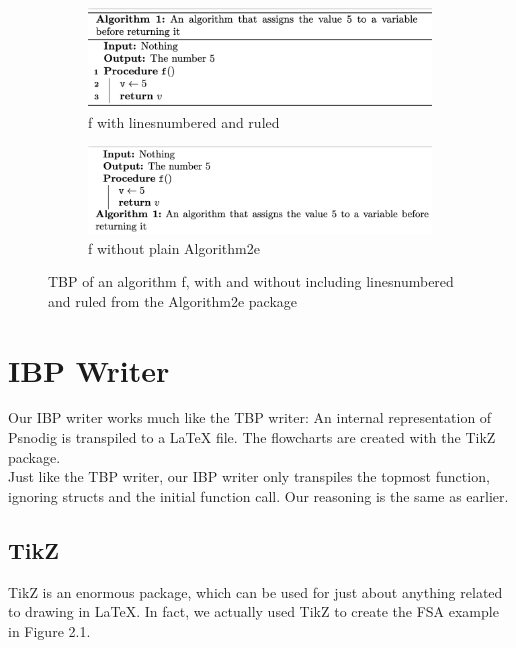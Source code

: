 {\begin{figure}[ht]
\centering
\begin{subfigure}{.5\textwidth}
  \centering
  \includegraphics[width=.9\linewidth]{assets/return5pretty.png}
  \caption{f with linesnumbered and ruled}
  \label{fig:algoUgly}
\end{subfigure}%
\begin{subfigure}{.5\textwidth}
  \centering
  \includegraphics[width=.9\linewidth]{assets/return5ugly.png}
  \caption{f without plain Algorithm2e}
  \label{fig:algoPretty}
\end{subfigure}
\caption{TBP of an algorithm f, with and without including linesnumbered and ruled from the Algorithm2e package}
\label{fig:algoWithAndWithoutParams}
\end{figure}

\section{IBP Writer}

Our IBP writer works much like the TBP writer: An internal representation of Psnodig is transpiled to a LaTeX file. The flowcharts are created with the TikZ package. \hfill \\

Just like the TBP writer, our IBP writer only transpiles the topmost function, ignoring structs and the initial function call. Our reasoning is the same as earlier.

\subsection{TikZ}

TikZ is an enormous package, which can be used for just about anything related to drawing in LaTeX. In fact, we actually used TikZ to create the FSA example in Figure 2.1. \hfill \\

}
